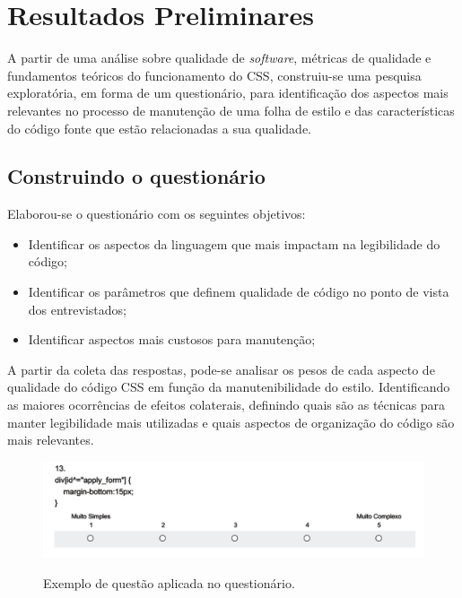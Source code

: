 %
%

\chapter{Resultados Preliminares}

A partir de uma análise sobre qualidade de \textit{software}, métricas de qualidade e fundamentos teóricos do funcionamento do CSS, construiu-se uma pesquisa exploratória, em forma de um questionário, para identificação dos aspectos mais relevantes no processo de manutenção de uma folha de estilo e das características do código fonte que estão relacionadas a sua qualidade.

\section{Construindo o questionário}
Elaborou-se o questionário com os seguintes objetivos:

\begin{itemize}
	\item Identificar os aspectos da linguagem que mais impactam na legibilidade do código;
	\item Identificar os parâmetros que definem qualidade de código no ponto de vista dos entrevistados;
	\item Identificar aspectos mais custosos para manutenção;	
\end{itemize}

A partir da coleta das respostas, pode-se analisar os pesos de cada aspecto de qualidade do código CSS em função da manutenibilidade do estilo. Identificando as maiores ocorrências de efeitos colaterais, definindo quais são as técnicas para manter legibilidade mais utilizadas e quais aspectos de organização do código são mais relevantes.

\begin{figure}[!htb]
	\centering
	\caption{Exemplo de questão aplicada no questionário.}
	\includegraphics[width=1\textwidth]{./04-figuras/questionario_q13}
	\label{fig:questionario_q13}
\end{figure}

